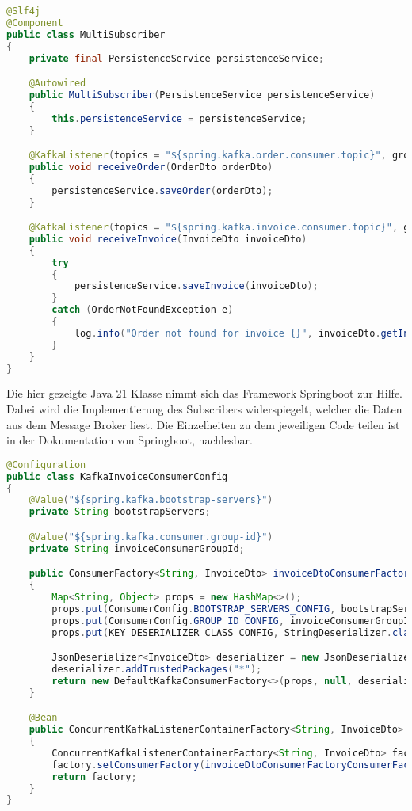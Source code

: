 \begin{lstlisting}[language=Java, caption=Implementierung des Subscribers für Orders und Invoices]
@Slf4j
@Component
public class MultiSubscriber
{
	private final PersistenceService persistenceService;

	@Autowired
	public MultiSubscriber(PersistenceService persistenceService)
	{
		this.persistenceService = persistenceService;
	}

	@KafkaListener(topics = "${spring.kafka.order.consumer.topic}", groupId = "${spring.kafka.consumer.group-id}", containerFactory = "orderDtoKafkaListenerContainerFactory")
	public void receiveOrder(OrderDto orderDto)
	{
		persistenceService.saveOrder(orderDto);
	}

	@KafkaListener(topics = "${spring.kafka.invoice.consumer.topic}", groupId = "${spring.kafka.consumer.group-id}", containerFactory = "invoiceDtoKafkaListenerContainerFactory")
	public void receiveInvoice(InvoiceDto invoiceDto)
	{
		try
		{
			persistenceService.saveInvoice(invoiceDto);
		}
		catch (OrderNotFoundException e)
		{
			log.info("Order not found for invoice {}", invoiceDto.getInvoiceNumber());
        }
    }
}
\end{lstlisting}

Die hier gezeigte Java 21 Klasse nimmt sich das Framework Springboot zur Hilfe. Dabei wird die Implementierung des Subscribers widerspiegelt, welcher die Daten aus dem Message Broker liest. Die Einzelheiten zu dem jeweiligen Code teilen ist in der Dokumentation von Springboot, \cite{springboot_spring_2025} nachlesbar.

\begin{lstlisting}[language=Java, caption=Konfiguration des Message Brokers im Code]
@Configuration
public class KafkaInvoiceConsumerConfig
{
    @Value("${spring.kafka.bootstrap-servers}")
	private String bootstrapServers;

	@Value("${spring.kafka.consumer.group-id}")
	private String invoiceConsumerGroupId;

	public ConsumerFactory<String, InvoiceDto> invoiceDtoConsumerFactoryConsumerFactory()
	{
		Map<String, Object> props = new HashMap<>();
		props.put(ConsumerConfig.BOOTSTRAP_SERVERS_CONFIG, bootstrapServers);
		props.put(ConsumerConfig.GROUP_ID_CONFIG, invoiceConsumerGroupId);
		props.put(KEY_DESERIALIZER_CLASS_CONFIG, StringDeserializer.class);

		JsonDeserializer<InvoiceDto> deserializer = new JsonDeserializer<>(InvoiceDto.class, false);
		deserializer.addTrustedPackages("*");
		return new DefaultKafkaConsumerFactory<>(props, null, deserializer);
	}

	@Bean
	public ConcurrentKafkaListenerContainerFactory<String, InvoiceDto> invoiceDtoKafkaListenerContainerFactory()
	{
		ConcurrentKafkaListenerContainerFactory<String, InvoiceDto> factory = new ConcurrentKafkaListenerContainerFactory<>();
		factory.setConsumerFactory(invoiceDtoConsumerFactoryConsumerFactory());
		return factory;
	}
}
\end{lstlisting}

